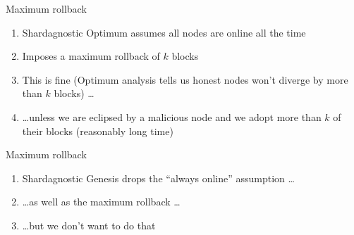 \documentclass[usenames,dvipsnames,t]{beamer}
\begin{document}
\begin{frame}{Maximum rollback}

\begin{enumerate}

\item Shardagnostic Optimum assumes all nodes are online all the time

\item Imposes a maximum rollback of $k$ blocks

\item This is fine (Optimum analysis tells us honest nodes won't diverge by more than $k$ blocks) \dots

\pause

\item \dots unless we are eclipsed by a malicious node and we adopt more than
$k$ of their blocks (reasonably long time)

\end{enumerate}

\end{frame}


\begin{frame}{Maximum rollback}

\begin{enumerate}

\item Shardagnostic Genesis drops the ``always online'' assumption \dots \pause

\item \dots as well as the maximum rollback \dots \pause

\item \dots but we don't want to do that

\end{enumerate}

\end{frame}

\end{document}
